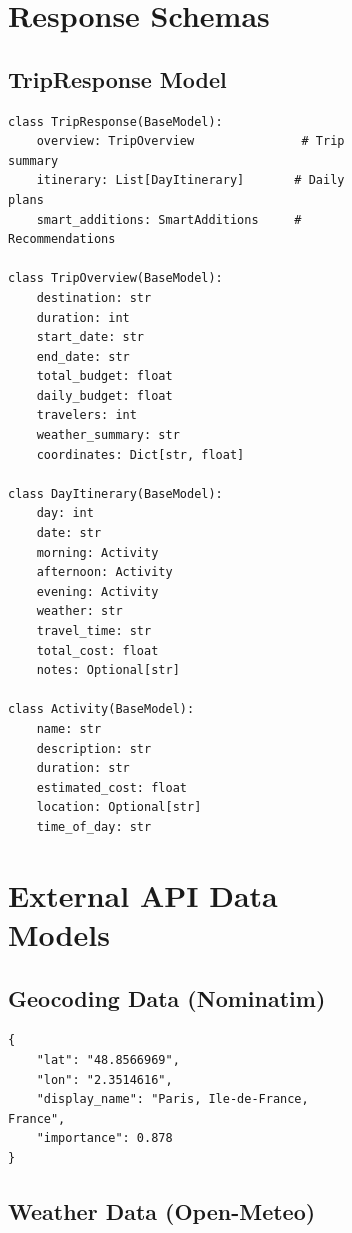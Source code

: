 \documentclass[12pt,a4paper]{report}
\begin{document}
\begin{figure}[H]
\begin{plantuml}
\begin{figure}[H]
\begin{plantuml}
\section{Response Schemas}

\subsection{TripResponse Model}

\begin{lstlisting}[style=pythonstyle, caption={TripResponse Pydantic Model}]
class TripResponse(BaseModel):
    overview: TripOverview               # Trip summary
    itinerary: List[DayItinerary]       # Daily plans
    smart_additions: SmartAdditions     # Recommendations

class TripOverview(BaseModel):
    destination: str
    duration: int
    start_date: str
    end_date: str
    total_budget: float
    daily_budget: float
    travelers: int
    weather_summary: str
    coordinates: Dict[str, float]

class DayItinerary(BaseModel):
    day: int
    date: str
    morning: Activity
    afternoon: Activity
    evening: Activity
    weather: str
    travel_time: str
    total_cost: float
    notes: Optional[str]

class Activity(BaseModel):
    name: str
    description: str
    duration: str
    estimated_cost: float
    location: Optional[str]
    time_of_day: str
\end{lstlisting}

\section{External API Data Models}

\subsection{Geocoding Data (Nominatim)}

\begin{lstlisting}[style=jsonStyle, caption={Nominatim API Response}]
{
    "lat": "48.8566969",
    "lon": "2.3514616",
    "display_name": "Paris, Ile-de-France, France",
    "importance": 0.878
}
\end{lstlisting}

\subsection{Weather Data (Open-Meteo)}


\end{plantuml}
\end{figure}
\end{plantuml}
\end{figure}
\end{document}
